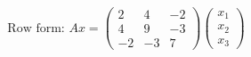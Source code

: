 \documentclass[preview]{standalone}
\begin{document}
\begin{align*}
\text{Row form: } Ax = \begin{pmatrix}2 & 4 & -2\\4 & 9 & -3\\-2 & -3 & 7\end{pmatrix}\begin{pmatrix} x_1 \\ x_2 \\ x_3 \end{pmatrix}
\end{align*}
\end{document}
